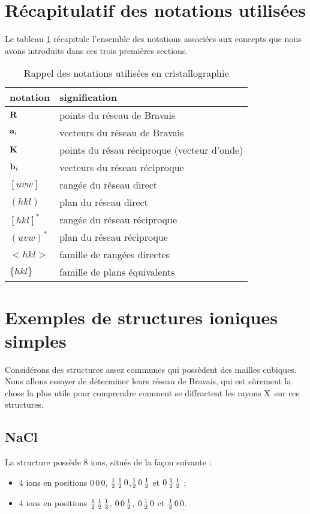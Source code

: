\section{Récapitulatif des notations utilisées}

Le tableau \ref{tab:rappel} récapitule l'ensemble des notations associées aux concepts que nous avons introduits dans ces trois premières sections.

\begin{table}[ht]
\begin{tabularx}{\textwidth}{Xl}
\toprule
notation & signification \\
\midrule
$\mathbf{R}$ & points du réseau de Bravais \\
$\mathbf{a}_i$ & vecteurs du réseau de Bravais \\
$\mathbf{K}$ & points du résau réciproque (vecteur d'onde) \\
$\mathbf{b}_i$ & vecteurs du réseau réciproque \\
$[u v w]$ & rangée du réseau direct\\
$(hkl)$ & plan du réseau direct \\
$[hkl]^*$ & rangée du réseau réciproque \\
$(uvw)^*$ & plan du réseau réciproque \\
$<hkl>$ & famille de rangées directes \\
$\{hkl\}$ & famille de plans équivalents\\
\bottomrule
\end{tabularx}
\caption[Notations utilisées en cristallographie]{Rappel des notations utilisées en cristallographie}
\label{tab:rappel}
\end{table}


\section{Exemples de structures ioniques simples}

Considérons des structures assez communes qui possèdent des mailles cubiques. Nous allons essayer de déterminer leurs réseau de Bravais, qui est sûrement la chose la plus utile pour comprendre comment se diffractent les rayons X sur ces structures.

\subsection{NaCl}
La structure  possède 8 ions, situés de la façon suivante :
\begin{itemize}
    \item 4 ions  en positions $0\,0\,0$, $\mbox{$\frac{1}{2}$}\,\mbox{$\frac{1}{2}$}\,0$,$\mbox{$\frac{1}{2}$}\,0\,\mbox{$\frac{1}{2}$}$ et $0\,\mbox{$\frac{1}{2}$}\,\mbox{$\frac{1}{2}$}$ ;
    \item 4 ions  en positions $\mbox{$\frac{1}{2}$}\,\mbox{$\frac{1}{2}$}\,\mbox{$\frac{1}{2}$}$, $0\,0\,\mbox{$\frac{1}{2}$}$, $0\,\mbox{$\frac{1}{2}$}\,0$ et $\mbox{$\frac{1}{2}$}\,0\,0$.
\end{itemize}

